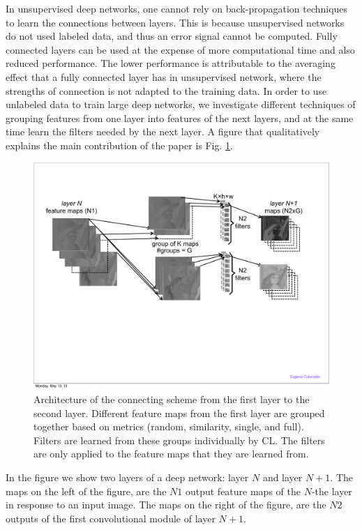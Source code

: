 \documentclass{article} %
\begin{document}
In unsupervised deep networks, one cannot rely on back-propagation techniques to learn the connections between layers. This is because unsupervised networks do not used labeled data, and thus an error signal cannot be computed. Fully connected layers can be used \cite{culurciello2013clustering,coates_analysis_2011} at the expense of more computational time and also reduced performance. The lower performance is attributable to the averaging effect that a fully connected layer has in unsupervised network, where the strengths of connection is not adapted to the training data. In order to use unlabeled data to train large deep networks, we investigate different techniques of grouping features from one layer into features of the next layers, and at the same time learn the filters needed by the next layer. A figure that qualitatively explains the main contribution of the paper is Fig. \ref{fig-learnlayers}.

\begin{figure}
\includegraphics[width=5in]{fig-learnlayers.pdf}
\caption{Architecture of the connecting scheme from the first layer to the second layer. Different feature maps from the first layer are grouped together based on metrics (random, similarity, single, and full). Filters are learned from these groups individually by CL. The filters are only applied to the feature maps that they are learned from.}
\label{fig-learnlayers}
\end{figure}


In the figure we show two layers of a deep network: layer $N$ and layer $N+1$. The maps on the left of the figure, are the $N1$ output feature maps of the $N$-the layer in response to an input image. The maps on the right of the figure, are the $N2$ outputs of the first convolutional module of layer $N+1$. 
\end{document}
